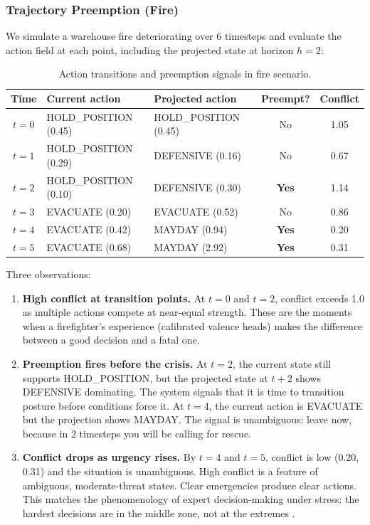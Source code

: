 \documentclass[11pt]{article}
\begin{document}
\subsubsection{Trajectory Preemption (Fire)}

We simulate a warehouse fire deteriorating over 6 timesteps and evaluate the action field at each point, including the projected state at horizon $h=2$:

\begin{table}[h]
\centering
\caption{Action transitions and preemption signals in fire scenario.}
\label{tab:preemption}
\begin{tabular}{cllcc}
\toprule
\textbf{Time} & \textbf{Current action} & \textbf{Projected action} & \textbf{Preempt?} & \textbf{Conflict} \\
\midrule
$t=0$ & HOLD\_POSITION (0.45) & HOLD\_POSITION (0.45) & No & 1.05 \\
$t=1$ & HOLD\_POSITION (0.29) & DEFENSIVE (0.16) & No & 0.67 \\
$t=2$ & HOLD\_POSITION (0.10) & DEFENSIVE (0.30) & \textbf{Yes} & 1.14 \\
$t=3$ & EVACUATE (0.20) & EVACUATE (0.52) & No & 0.86 \\
$t=4$ & EVACUATE (0.42) & MAYDAY (0.94) & \textbf{Yes} & 0.20 \\
$t=5$ & EVACUATE (0.68) & MAYDAY (2.92) & \textbf{Yes} & 0.31 \\
\bottomrule
\end{tabular}
\end{table}

Three observations:

\begin{enumerate}
    \item \textbf{High conflict at transition points.} At $t=0$ and $t=2$, conflict exceeds 1.0 as multiple actions compete at near-equal strength. These are the moments when a firefighter's experience (calibrated valence heads) makes the difference between a good decision and a fatal one.

    \item \textbf{Preemption fires before the crisis.} At $t=2$, the current state still supports HOLD\_POSITION, but the projected state at $t+2$ shows DEFENSIVE dominating. The system signals that it is time to transition posture before conditions force it. At $t=4$, the current action is EVACUATE but the projection shows MAYDAY. The signal is unambiguous: leave now, because in 2 timesteps you will be calling for rescue.

    \item \textbf{Conflict drops as urgency rises.} By $t=4$ and $t=5$, conflict is low (0.20, 0.31) and the situation is unambiguous. High conflict is a feature of ambiguous, moderate-threat states. Clear emergencies produce clear actions. This matches the phenomenology of expert decision-making under stress: the hardest decisions are in the middle zone, not at the extremes \citep{klein1998}.
\end{enumerate}
\end{document}
